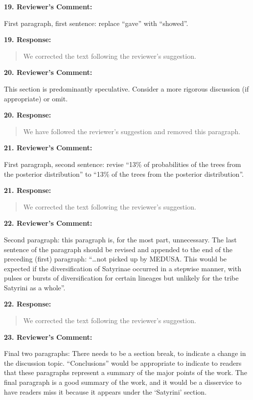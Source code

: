 \documentclass[]{article}
\begin{document}
\textbf{19. Reviewer's Comment:}

First paragraph, first sentence: replace ``gave'' with ``showed''.

\textbf{19. Response:}

\begin{quote}
\color{blue}
We corrected the text following the reviewer's suggestion.
\end{quote}

\textbf{20. Reviewer's Comment:}

This section is predominantly speculative. Consider a more rigorous
discussion (if appropriate) or omit.

\textbf{20. Response:}

\begin{quote}
\color{blue}
We have followed the reviewer's suggestion and removed this paragraph.
\end{quote}

\textbf{21. Reviewer's Comment:}

First paragraph, second sentence: revise ``13\% of probabilities of the
trees from the posterior distribution'' to ``13\% of the trees from the
posterior distribution''.

\textbf{21. Response:}

\begin{quote}
\color{blue}
\color{blue}
\color{blue}
We corrected the text following the reviewer's suggestion.
\end{quote}

\textbf{22. Reviewer's Comment:}

Second paragraph: this paragraph is, for the most part, unnecessary. The
last sentence of the paragraph should be revised and appended to the end
of the preceding (first) paragraph: ``\ldots{}not picked up by MEDUSA.
This would be expected if the diversification of Satyrinae occurred in a
stepwise manner, with pulses or bursts of diversification for certain
lineages but unlikely for the tribe Satyrini as a whole''.

\textbf{22. Response:}

\begin{quote}
\color{blue}
\color{blue}
\color{blue}
We corrected the text following the reviewer's suggestion.
\end{quote}

\textbf{23. Reviewer's Comment:}

Final two paragraphs: There needs to be a section break, to indicate a
change in the discussion topic. ``Conclusions'' would be appropriate to
indicate to readers that these paragraphs represent a summary of the
major points of the work. The final paragraph is a good summary of the
work, and it would be a disservice to have readers miss it because it
appears under the `Satyrini' section.
\end{document}
